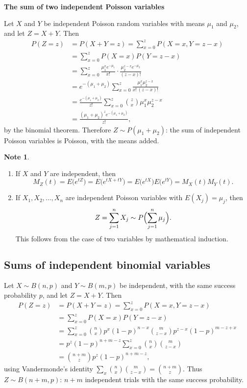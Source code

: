 \documentclass[11pt,a4paper]{article}
\theoremstyle{definition}
\newtheorem*{note}{Note}
\newcommand{\subhead}[1]{%
  \par\medskip\noindent\textbf{#1}\par\nobreak\smallskip}
\begin{document}
\subhead{The sum of two independent Poisson variables}
Let $X$ and $Y$ be independent Poisson random variables with means $\mu_1$ and $\mu_2$, and let $Z = X + Y$. Then
\begin{align*}
P(Z = z) &= P(X + Y = z) = \sum_{x=0}^zP(X = x, Y = z - x) \\
&= \sum_{x=0}^zP(X = x)P(Y = z - x) \\
&= \sum_{x=0}^z\frac{\mu_1^xe^{-\mu_1}}{x!}\cdot\frac{\mu_2^{z-x}e^{-\mu_2}}{(z - x)!} \\
&= e^{-(\mu_1+\mu_2)}\sum_{x=0}^z\frac{\mu_1^x\mu_2^{z-x}}{x!\,(z - x)!} \\
&= \frac{e^{-(\mu_1+\mu_2)}}{z!}\sum_{x=0}^z\binom zx\mu_1^x\mu_2^{z-x} \\
&= \frac{(\mu_1 + \mu_2)^ze^{-(\mu_1+\mu_2)}}{z!} ,
\end{align*}
by the binomial theorem. Therefore $Z \sim P(\mu_1 + \mu_2)$: the sum of independent Poisson variables is Poisson, with the means
added.

\begin{note}
\begin{enumerate}
\item If $X$ and $Y$ are independent, then
\[
M_Z(t) = E\bigl(e^{tZ}\bigr) = E\bigl(e^{tX + tY}\bigr) = E\bigl(e^{tX}\bigr)E\bigl(e^{tY}\bigr) = M_X(t)M_Y(t) .
\]
\item If $X_1, X_2, \dots, X_n$ are independent Poisson variables with $E(X_j) = \mu_j$, then
\[
Z = \sum_{j=1}^nX_j \sim P\Bigl(\sum_{j=1}^n\mu_j\Bigr) .
\]
This follows from the case of two variables by mathematical induction.
\end{enumerate}
\end{note}

\subsection{Sums of independent binomial variables}
Let $X \sim B(n, p)$ and $Y \sim B(m, p)$ be independent, with the same success probability $p$, and let $Z = X + Y$. Then
\begin{align*}
P(Z = z) &= P(X + Y = z) = \sum_{x=0}^zP(X = x, Y = z - x) \\
&= \sum_{x=0}^zP(X = x)P(Y = z - x) \\
&= \sum_{x=0}^z\binom nxp^x(1 - p)^{n-x}\binom m{z-x}p^{z-x}(1 - p)^{m-z+x} \\
&= p^z(1 - p)^{n+m-z}\sum_{x=0}^z\binom nx\binom m{z-x} \\
&= \binom{n+m}zp^z(1 - p)^{n+m-z} ,
\end{align*}
using Vandermonde's identity $\sum_x\binom nx\binom m{z-x} = \binom{n+m}z$. Thus $Z \sim B(n + m, p)$: $n + m$ independent trials with the same success
probability.
\end{document}
